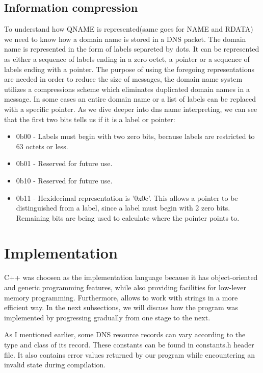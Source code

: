 \documentclass[11pt,a4paper]{article}
\begin{document}
\subsection{Information compression}
To understand how QNAME is represented(same goes for NAME and RDATA) we need to know how a domain name is stored in a DNS packet. The domain name is represented in the form of labels separeted by dots. It can be represented as either a sequence of labels ending in a zero octet, a pointer or a sequence of labels ending with a pointer. The purpose of using the foregoing representations are needed in order to reduce the size of messages, the domain name system utilizes a compressions scheme which eliminates duplicated domain names in a message. In some cases an entire domain name or a list of labels can be replaced with a specific pointer.
As we dive deeper into dns name interpreting, we can see that the first two bits tells us if it is a label or pointer:
\begin{itemize}
    \item 0b00 - Labels must begin with two zero bits, because labels are restricted to 63 octets or less.
    \item 0b01 - Reserved for future use.
    \item 0b10 - Reserved for future use.
    \item 0b11 - Hexidecimal representation is '0x0c'. This allows a pointer to be distinguished from a label, since a label must begin with 2 zero bits. Remaining bits are being used to calculate where the pointer points to.
\end{itemize}

\newpage
\section{Implementation}
C++ was choosen as the implementation language because it has object-oriented and generic programming features, while also providing facilities for low-lever memory programming. Furthermore, allows to work with strings in a more efficient way. In the next subsections, we will discuss how the program was implemented by progressing gradually from one stage to the next.

As I mentioned earlier, some DNS resource records can vary according to the type and class of its record. These constants can be found in constants.h header file. It also contains error values returned by our program while encountering an invalid state during compilation.
\end{document}
